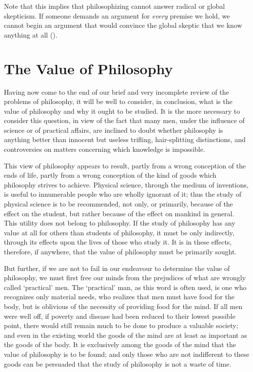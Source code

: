 \documentclass[oneside,letterpaper,12pt]{book}
\begin{document}
Note that this implies that philosophizing cannot answer radical or global skepticism. If someone demands an argument for \textit{every} premise we hold, we cannot begin an argument that would convince the global skeptic that we know anything at all (\pageref{skeptic}).

\hypertarget{chapter-xv.-the-value-of-philosophy}{%
\chapter{The Value of Philosophy}\label{chapter-xv.-the-value-of-philosophy}}
Having now come to the end of our brief and very incomplete review of
the problems of philosophy, it will be well to consider, in conclusion,
what is the value of philosophy and why it ought to be studied. It is
the more necessary to consider this question, in view of the fact that
many men, under the influence of science or of practical affairs, \label{practical} are
inclined to doubt whether philosophy is anything better than innocent
but useless trifling, hair-splitting distinctions, and controversies on
matters concerning which knowledge is impossible.

This view of philosophy appears to result, partly from a wrong
conception of the ends of life, partly from a wrong conception of the
kind of goods which philosophy strives to achieve. Physical science,
through the medium of inventions, is useful to innumerable people who
are wholly ignorant of it; thus the study of physical science is to be
recommended, not only, or primarily, because of the effect on the
student, but rather because of the effect on mankind in general. This
utility does not belong to philosophy. If the study of philosophy has
any value at all for others than students of philosophy, it must be only
indirectly, through its effects upon the lives of those who study it. It
is in these effects, therefore, if anywhere, that the value of
philosophy must be primarily sought. \label{indirectly}

But further, if we are not to fail in our endeavour to determine the
value of philosophy, we must first free our minds from the prejudices of
what are wrongly called `practical'
men. \label{materialonly} The `practical' man, as this word
is often used, is one who recognizes only material needs, who realizes
that men must have food for the body, but is oblivious of the necessity
of providing food for the mind. If all men were well off, if poverty and
disease had been reduced to their lowest possible point, there would
still remain much to be done to produce a valuable society; and even in
the existing world the goods of the mind are at least as important as
the goods of the body. It is exclusively among the goods of the mind
that the value of philosophy is to be found; and only those who are not
indifferent to these goods can be persuaded that the study of philosophy
is not a waste of time. \label{waste}
\end{document}

